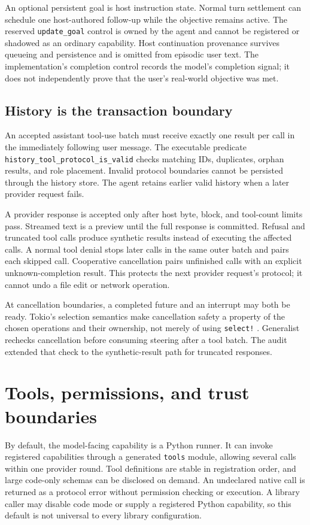 \documentclass[10pt,letterpaper]{article}
\newcommand{\code}[1]{\texttt{#1}}
\begin{document}
An optional persistent goal is host instruction state. Normal turn settlement
can schedule one host-authored follow-up while the objective remains active.
The reserved \code{update\_goal} control is owned by the agent and cannot be
registered or shadowed as an ordinary capability. Host continuation provenance
survives queueing and persistence and is omitted from episodic user text.
The implementation's completion control records the model's completion signal;
it does not independently prove that the user's real-world objective was met.

\subsection{History is the transaction boundary}
An accepted assistant tool-use batch must receive exactly one result per call
in the immediately following user message. The executable predicate
\code{history\_tool\_protocol\_is\_valid} checks matching IDs, duplicates,
orphan results, and role placement. Invalid protocol boundaries cannot be
persisted through the history store. The agent retains earlier valid history
when a later provider request fails.

A provider response is accepted only after host byte, block, and tool-count
limits pass. Streamed text is a preview until the full response is committed.
Refusal and truncated tool calls produce synthetic results instead of executing
the affected calls. A normal tool denial stops later calls in the same outer
batch and pairs each skipped call. Cooperative cancellation pairs unfinished
calls with an explicit unknown-completion result. This protects the next
provider request's protocol; it cannot undo a file edit or network operation.

At cancellation boundaries, a completed future and an interrupt may both be
ready. Tokio's selection semantics make cancellation safety a property of the
chosen operations and their ownership, not merely of using \code{select!}
\cite{tokioselect}. Generalist rechecks cancellation before consuming steering
after a tool batch. The audit extended that check to the synthetic-result path
for truncated responses.

\section{Tools, permissions, and trust boundaries}
By default, the model-facing capability is a Python runner. It can invoke
registered capabilities through a generated \code{tools} module, allowing
several calls within one provider round. Tool definitions are stable in
registration order, and large code-only schemas can be disclosed on demand.
An undeclared native call is returned as a protocol error without permission
checking or execution. A library caller may disable code mode or supply a
registered Python capability, so this default is not universal to every library
configuration.
\end{document}
